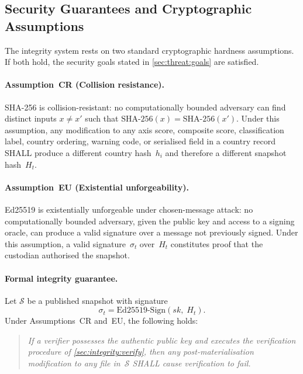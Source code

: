 \subsection{Security Guarantees and Cryptographic Assumptions}%
\label{sec:threat:crypto}

The integrity system rests on two standard cryptographic hardness
assumptions.  If both hold, the security goals stated in
\cref{sec:threat:goals} are satisfied.

\paragraph{Assumption~CR (Collision resistance).}
SHA-256 is collision-resistant: no computationally bounded adversary can
find distinct inputs \(x \neq x'\) such that
\(\mathrm{SHA\text{-}256}(x) = \mathrm{SHA\text{-}256}(x')\).
Under this assumption, any modification to any axis score, composite
score, classification label, country ordering, warning code, or
serialised field in a country record SHALL produce a different country
hash~\(h_i\) and therefore a different snapshot hash~\(H_t\).

\paragraph{Assumption~EU (Existential unforgeability).}
Ed25519 is existentially unforgeable under chosen-message attack: no
computationally bounded adversary, given the public key and access to a
signing oracle, can produce a valid signature over a message not
previously signed.  Under this assumption, a valid signature~\(\sigma_t\)
over~\(H_t\) constitutes proof that the custodian authorised the snapshot.

\paragraph{Formal integrity guarantee.}
Let \(\mathcal{S}\) be a published snapshot with signature
\[
  \sigma_t = \mathrm{Ed25519\text{-}Sign}(sk,\; H_t).
\]
Under Assumptions~CR and~EU, the following holds:

\begin{quote}\itshape
If a verifier possesses the authentic public key and executes the
verification procedure of\/ \cref{sec:integrity:verify}, then any
post-materialisation modification to any file in~\(\mathcal{S}\)
SHALL cause verification to fail.
\end{quote}

